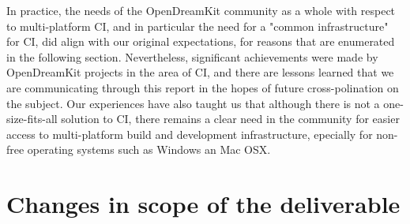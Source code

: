 \documentclass{deliverablereport}
\begin{document}
In practice, the needs of the OpenDreamKit community as a whole with respect to
multi-platform CI, and in particular the need for a "common infrastructure" for
CI, did align with our original expectations, for reasons that are enumerated
in the following section.  Nevertheless, significant achievements were made by
OpenDreamKit projects in the area of CI, and there are lessons learned that we
are communicating through this report in the hopes of future cross-polination
on the subject.  Our experiences have also taught us that although there is not
a one-size-fits-all solution to CI, there remains a clear need in the community
for easier access to multi-platform build and development infrastructure,
epecially for non-free operating systems such as Windows an Mac OSX.

\hypertarget{changes-to-deliverable}{%
\section{Changes in scope of the deliverable}\label{changes-to-deliverable}}

%
%
%
%
%
%
\end{document}
